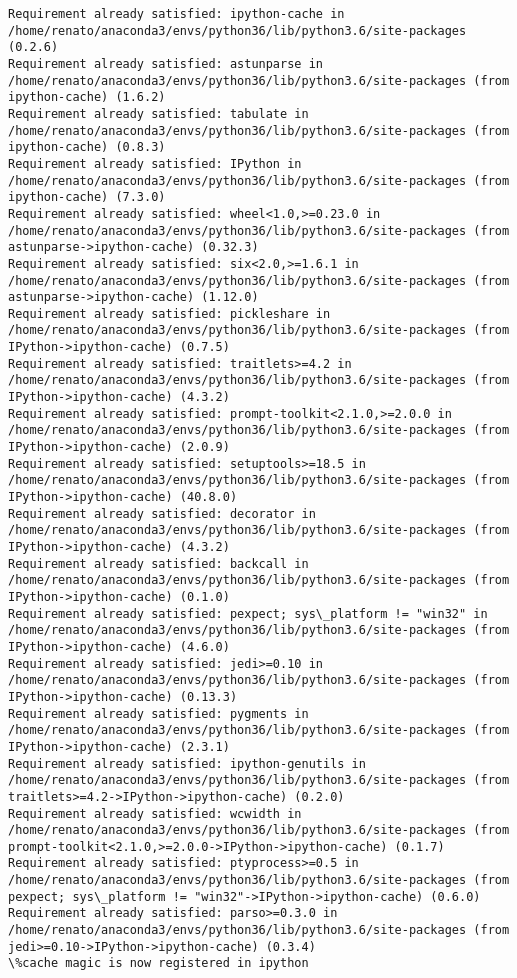 \documentclass[11pt]{article}
\begin{document}
    \begin{Verbatim}[commandchars=\\\{\}]
Requirement already satisfied: ipython-cache in /home/renato/anaconda3/envs/python36/lib/python3.6/site-packages (0.2.6)
Requirement already satisfied: astunparse in /home/renato/anaconda3/envs/python36/lib/python3.6/site-packages (from ipython-cache) (1.6.2)
Requirement already satisfied: tabulate in /home/renato/anaconda3/envs/python36/lib/python3.6/site-packages (from ipython-cache) (0.8.3)
Requirement already satisfied: IPython in /home/renato/anaconda3/envs/python36/lib/python3.6/site-packages (from ipython-cache) (7.3.0)
Requirement already satisfied: wheel<1.0,>=0.23.0 in /home/renato/anaconda3/envs/python36/lib/python3.6/site-packages (from astunparse->ipython-cache) (0.32.3)
Requirement already satisfied: six<2.0,>=1.6.1 in /home/renato/anaconda3/envs/python36/lib/python3.6/site-packages (from astunparse->ipython-cache) (1.12.0)
Requirement already satisfied: pickleshare in /home/renato/anaconda3/envs/python36/lib/python3.6/site-packages (from IPython->ipython-cache) (0.7.5)
Requirement already satisfied: traitlets>=4.2 in /home/renato/anaconda3/envs/python36/lib/python3.6/site-packages (from IPython->ipython-cache) (4.3.2)
Requirement already satisfied: prompt-toolkit<2.1.0,>=2.0.0 in /home/renato/anaconda3/envs/python36/lib/python3.6/site-packages (from IPython->ipython-cache) (2.0.9)
Requirement already satisfied: setuptools>=18.5 in /home/renato/anaconda3/envs/python36/lib/python3.6/site-packages (from IPython->ipython-cache) (40.8.0)
Requirement already satisfied: decorator in /home/renato/anaconda3/envs/python36/lib/python3.6/site-packages (from IPython->ipython-cache) (4.3.2)
Requirement already satisfied: backcall in /home/renato/anaconda3/envs/python36/lib/python3.6/site-packages (from IPython->ipython-cache) (0.1.0)
Requirement already satisfied: pexpect; sys\_platform != "win32" in /home/renato/anaconda3/envs/python36/lib/python3.6/site-packages (from IPython->ipython-cache) (4.6.0)
Requirement already satisfied: jedi>=0.10 in /home/renato/anaconda3/envs/python36/lib/python3.6/site-packages (from IPython->ipython-cache) (0.13.3)
Requirement already satisfied: pygments in /home/renato/anaconda3/envs/python36/lib/python3.6/site-packages (from IPython->ipython-cache) (2.3.1)
Requirement already satisfied: ipython-genutils in /home/renato/anaconda3/envs/python36/lib/python3.6/site-packages (from traitlets>=4.2->IPython->ipython-cache) (0.2.0)
Requirement already satisfied: wcwidth in /home/renato/anaconda3/envs/python36/lib/python3.6/site-packages (from prompt-toolkit<2.1.0,>=2.0.0->IPython->ipython-cache) (0.1.7)
Requirement already satisfied: ptyprocess>=0.5 in /home/renato/anaconda3/envs/python36/lib/python3.6/site-packages (from pexpect; sys\_platform != "win32"->IPython->ipython-cache) (0.6.0)
Requirement already satisfied: parso>=0.3.0 in /home/renato/anaconda3/envs/python36/lib/python3.6/site-packages (from jedi>=0.10->IPython->ipython-cache) (0.3.4)
\%cache magic is now registered in ipython

    \end{Verbatim}
\end{document}
